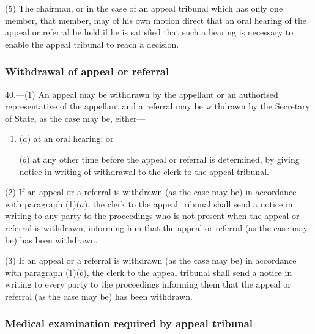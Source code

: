 \documentclass[12pt,a4paper]{article}
\begin{document}
(5) The chairman, or in the case of an appeal tribunal which has only one member, that member, may of his own motion direct that an oral hearing of the appeal or referral be held if he is satisfied that such a hearing is necessary to enable the appeal tribunal to reach a decision.

\subsubsection[40. Withdrawal of appeal or referral]{Withdrawal of appeal or referral}

40.—(1) An appeal may be withdrawn by the appellant or an authorised representative of the appellant and a referral may be withdrawn by the Secretary of State, as the case may be, either—
\begin{enumerate}\item[]
($a$) at an oral hearing; or

($b$) at any other time before the appeal or referral is determined, by giving notice in writing of withdrawal to the clerk to the appeal tribunal.
\end{enumerate}

(2) If an appeal or a referral is withdrawn (as the case may be) in accordance with paragraph (1)($a$), the clerk to the appeal tribunal shall send a notice in writing to any party to the proceedings who is not present when the appeal or referral is withdrawn, informing him that the appeal or referral (as the case may be) has been withdrawn.

(3) If an appeal or a referral is withdrawn (as the case may be) in accordance with paragraph (1)($b$), the clerk to the appeal tribunal shall send a notice in writing to every party to the proceedings informing them that the appeal or referral (as the case may be) has been withdrawn.

\subsubsection[41. Medical examination required by appeal tribunal]
{Medical examination required by appeal tribunal}
\end{document}
